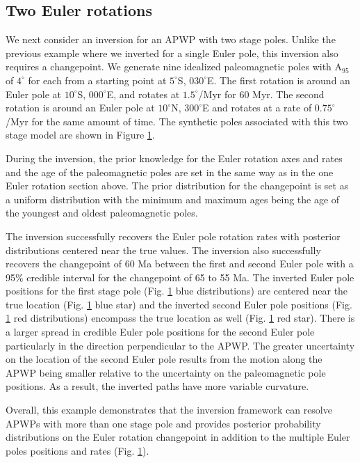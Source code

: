 \documentclass[11pt,letterpaper]{article}
\begin{document}
\begin{figure}
\label{fig:synthetic_pep}
\end{figure}

\subsection*{Two Euler rotations}
\label{sec:two_stage_poles}
We next consider an inversion for an APWP with two stage poles. Unlike the previous example where we inverted for a single Euler pole, this inversion also requires a changepoint. We generate nine idealized paleomagnetic poles with A$_{95}$ of $4^\circ$ for each from a starting point at $5^\circ$S, $030^\circ$E. The first rotation is around an Euler pole at $10^\circ$S, $000^\circ$E, and rotates at $1.5^\circ$/Myr for 60 Myr. The second rotation is around an Euler pole at $10^\circ$N, $300^\circ$E and rotates at a rate of $0.75^\circ$/Myr for the same amount of time. The synthetic poles associated with this two stage model are shown in Figure \ref{fig:synthetic_pep}. 

During the inversion, the prior knowledge for the Euler rotation axes and rates and the age of the paleomagnetic poles are set in the same way as in the one Euler rotation section above. The prior distribution for the changepoint is set as a uniform distribution with the minimum and maximum ages being the age of the youngest and oldest paleomagnetic poles. 

The inversion successfully recovers the Euler pole rotation rates with posterior distributions centered near the true values. The inversion also successfully recovers the changepoint of 60 Ma between the first and second Euler pole with a 95$\%$ credible interval for the changepoint of 65 to 55 Ma.  The inverted Euler pole positions for the first stage pole (Fig. \ref{fig:synthetic_pep} blue distributions) are centered near the true location (Fig. \ref{fig:synthetic_pep} blue star) and the inverted second Euler pole positions (Fig. \ref{fig:synthetic_pep} red distributions) encompass the true location as well (Fig. \ref{fig:synthetic_pep} red star). There is a larger spread in credible Euler pole positions for the second Euler pole particularly in the direction perpendicular to the APWP. The greater uncertainty on the location of the second Euler pole results from the motion along the APWP being smaller relative to the uncertainty on the paleomagnetic pole positions. As a result, the inverted paths have more variable curvature.  

Overall, this example demonstrates that the inversion framework can resolve APWPs with more than one stage pole and provides posterior probability distributions on the Euler rotation changepoint in addition to the multiple Euler poles positions and rates (Fig. \ref{fig:synthetic_pep}).
\end{document}
